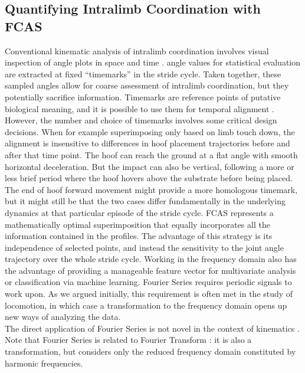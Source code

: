 \subsection{Quantifying Intralimb Coordination with FCAS}
Conventional kinematic analysis of intralimb coordination involves visual inspection of  angle plots in space and time \citep{Irschick1999,Fischer2002,Stoessel2012,Schmidt2008,Day2007,Polk2002,Nyakatura2010}.
 angle values for statistical evaluation are extracted at fixed ``timemarks'' in the stride cycle.
Taken together, these sampled  angles allow for coarse assessment of intralimb coordination, but they potentially sacrifice information.
Timemarks are reference points of putative biological meaning, and it is possible to use them for temporal alignment \citep[e.g.][]{HsiaoWecksler2010}.
However, the number and choice of timemarks involves some critical design decisions.
When for example superimposing only based on limb touch down, the alignment is insensitive to differences in hoof placement trajectories before and after that time point.
The hoof can reach the ground at a flat  angle with smooth horizontal deceleration.
But the impact can also be vertical, following a more or less brief period where the hoof hovers above the substrate before being placed.
The end of hoof forward movement might provide a more homologous timemark, but it might still be that the two cases differ fundamentally in the underlying dynamics at that particular episode of the stride cycle.
FCAS represents a mathematically optimal superimposition that equally incorporates all the information contained in the profiles.
The advantage of this strategy is its independence of selected points, and instead the sensitivity to the joint angle trajectory over the whole stride cycle.
Working in the frequency domain also has the advantage of providing a manageable feature vector for multivariate analysis or classification via machine learning.
Fourier Series requires periodic signals to work upon.
As we argued initially, this requirement is often met in the study of locomotion, in which case a transformation to the frequency domain opens up new ways of analyzing the data.
\\The direct application of Fourier Series \citep{Fourier1822,Gray1995,Bracewell2000} is not novel in the context of kinematics \citep[e.g.][]{Bernstein1935,Webb2007,Wheat2006,Pike2002}.
Note that Fourier Series is related to Fourier Transform \citep[cf.][]{Bracewell2000,Robertson2018}: it is also a transformation, but considers only the reduced frequency domain constituted by harmonic frequencies.
